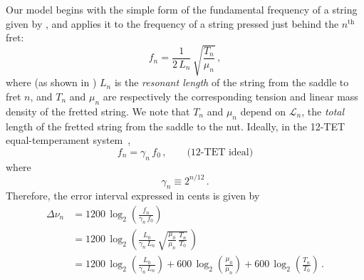 Our model begins with the simple form of the fundamental frequency of a string given by , and applies it to the frequency of a string pressed just behind the $n^\mathrm{th}$ fret:
 \begin{equation} \label{eqn:f_n_def}
f_n = \frac{1}{2\, L_n}\, \sqrt{\frac{T_n}{\mu_n}}\, ,
 \end{equation}
where (as shown in ) $L_n$ is the \emph{resonant length} of the string from the saddle to fret $n$, and $T_n$ and $\mu_n$ are respectively the corresponding tension and linear mass density of the fretted string. We note that $T_n$ and $\mu_n$ depend on $\mathcal{L}_n$, the \emph{total} length of the fretted string from the saddle to the nut. Ideally, in the 12-TET equal-temperament system~\cite{ref:durfee2015pms},
 \begin{equation} \label{eqn:f_n_tet}
f_n = \gamma_n\, f_0\, , \qquad \textrm{(12-TET~ideal)}
 \end{equation}
where
 \begin{equation} \label{eqn:gamme_n_def}
\gamma_n \equiv 2^{n / 12}\, .
 \end{equation}
Therefore, the error interval expressed in cents is given by
 \begin{equation}\label{eqn:error_def}
 \begin{split}
\Delta \nu_n &= 1200\, \log_2\left( \frac{f_n}{\gamma_n\, f_0} \right) \\
&= 1200\, \log_2 \left( \frac{L_0}{\gamma_n\, L_n}\, \sqrt{\frac{\mu_0}{\mu_n}\, \frac{T_n}{T_0}}\, \right) \\
&= 1200\, \log_2 \left( \frac{L_0}{\gamma_n\, L_n} \right) + 600\, \log_2 \left(  \frac{\mu_0}{\mu_n} \right) + 600\, \log_2 \left( \frac{T_n}{T_0} \right)\, .
 \end{split}
 \end{equation} 